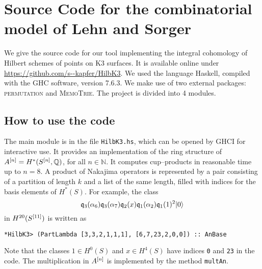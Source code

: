 
\section{Source Code for the combinatorial model of Lehn and Sorger}\label{IntCode}
We give the source code for our tool implementing the integral cohomology of Hilbert schemes of points on K3 surfaces. It is available online under \url{https://github.com/s--kapfer/HilbK3}. We used the language Haskell, compiled with the \textsc{GHC} software, version 7.6.3. We make use of two external packages: \textsc{permutation} and \textsc{MemoTrie}. The project is divided into 4 modules. 

\subsection{How to use the code}
The main module is in the file \verb|HilbK3.hs|, which can be opened by \textsc{GHCI} for interactive use. It provides an implementation of the ring structure of $A^{[n]}=H^*(S^{[n]},\mathbb{Q})$, for all $n\in\mathbb{N}$. 
It computes cup--products in reasonable time up to $n=8$.
A product of Nakajima operators is represented by a pair consisting of a partition of length $k$ and a list of the same length, filled with indices for the basis elements of $H^*(S)$. For example, the class
$$
\mathfrak{q}_{3}(\alpha_6)\mathfrak{q}_{3}(\alpha_7)\mathfrak{q}_2(x)\mathfrak{q}_{1}(\alpha_2)\mathfrak{q}_{1}(1)^2 |0\rangle 
$$
in $H^{20}(S^{[11]})$ is written as
\begin{verbatim}
*HilbK3> (PartLambda [3,3,2,1,1,1], [6,7,23,2,0,0]) :: AnBase 
\end{verbatim}
Note that the classes $1\in H^0(S)$ and $x\in H^4(S)$ have indices \verb|0| and \verb|23| in the code.
The multiplication in $A^{[n]}$ is implemented by the method \verb|multAn|. 

